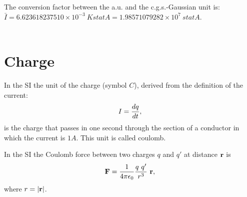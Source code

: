 \documentclass[12pt,a4paper]{article}
\def\bari{6.623618237510\times 10^{-3}}
\def\kappaa{1.000000000274\times 10^{-1}}
\def\baricgs{1.98571079282\times 10^{7}}
\begin{document}
%

{\color{green} The conversion factor between the a.u. and the c.g.s.-Gaussian 
unit is: $\bar I=\bari\ K statA=\baricgs\ statA$. \\
}
\\

\newpage
\section{\color{coral}Charge}
In the SI the unit of the charge (symbol $C$), derived from the definition 
of the current:
\begin{equation}
I={dq \over dt},
\label{current}
\end{equation}
is the charge that passes in one second through the section of a conductor
in which the current is $1 A$. This unit is called coulomb.

In the SI the Coulomb force between two charges $q$ and $q'$ at
distance ${\bf r}$ is
\begin{equation}
{\bf F} = {1\over 4 \pi \epsilon_0} {q\ q' \over r^3}\ {\bf r},
\label{coulomb}
\end{equation}
where $r=|{\bf r}|$.
\\
\end{document}
